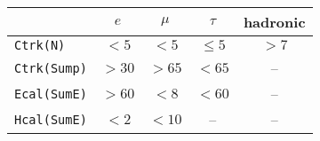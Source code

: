 \begin{tabular}{lcccc}
	\toprule
	 & $e$ & $\mu$ & $\tau$ & hadronic \\
	 \midrule
	\texttt{Ctrk(N)} & $<5$  & $<5$  & $\leq 5$ & $>7$ \\
	\texttt{Ctrk(Sump)} & $>30$ & $>65$ & $<65$ & --\\
	\texttt{Ecal(SumE)}  & $>60$ & $<8$  & $<60$ & -- \\
	\texttt{Hcal(SumE)}  & $<2$  & $<10$ & -- & -- \\
	\bottomrule
\end{tabular}